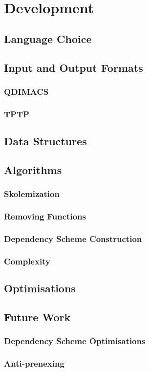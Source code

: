 \chapter{Development}

\section{Language Choice}

\section{Input and Output Formats}
\subsection{QDIMACS}
\subsection{TPTP}

\section{Data Structures}

\section{Algorithms}
\subsection{Skolemization}
\subsection{Removing Functions}
\subsection{Dependency Scheme Construction}
\subsection{Complexity}

\section{Optimisations}

\section{Future Work}
\subsection{Dependency Scheme Optimisations}
\subsection{Anti-prenexing}
